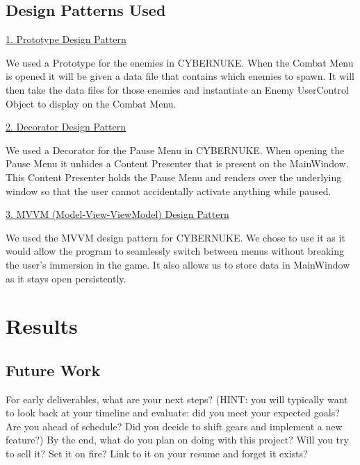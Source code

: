 \documentclass[10pt,conference,onecolumn,compsoc]{IEEEtran}
\begin{document}
\subsection{Design Patterns Used}
\underline{1. Prototype Design Pattern}
\vspace{5px}

We used a Prototype for the enemies in CYBERNUKE. When the Combat Menu is opened it will be given a data file that contains which enemies to spawn. It will then take the data files for those enemies and instantiate an Enemy UserControl Object to display on the Combat Menu.

\underline{2. Decorator Design Pattern}
\vspace{5px}

We used a Decorator for the Pause Menu in CYBERNUKE. When opening the Pause Menu it unhides a Content Presenter that is present on the MainWindow. This Content Presenter holds the Pause Menu and renders over the underlying window so that the user cannot accidentally activate anything while paused.

\underline{3. MVVM (Model-View-ViewModel) Design Pattern}
\vspace{5px}

We used the MVVM design pattern for CYBERNUKE. We chose to use it as it would allow the program to seamlessly switch between menus without breaking the user's immersion in the game. It also allows us to store data in MainWindow as it stays open persistently.


\section{Results}

\subsection{Future Work}
For early deliverables, what are your next steps?  (HINT: you will typically want to look back at your timeline and evaluate: did you meet your expected goals?  Are you ahead of schedule?  Did you decide to shift gears and implement a new feature?)
By the end, what do you plan on doing with this project?  Will you try to sell it?  Set it on fire?  Link to it on your resume and forget it exists?
\end{document}
